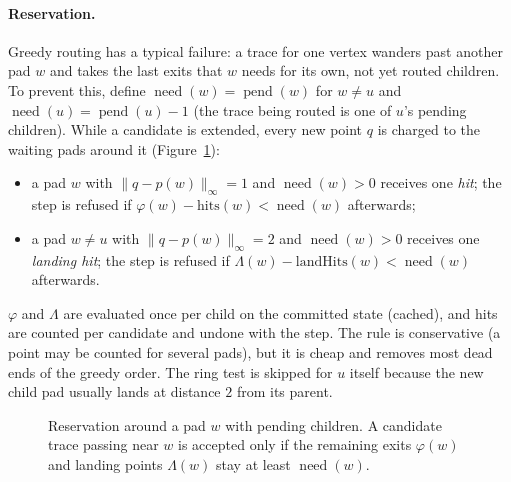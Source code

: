 \documentclass[11pt,a4paper]{article}
\newcommand{\gridbg}[4]{\draw[gridc,line width=0.4pt,step={(1,-1)}] (#1,#2) grid (#3,#4);}
\theoremstyle{remark}
\newcommand{\pos}{p}
\newcommand{\cheb}[1]{\lVert #1 \rVert_\infty}
\newcommand{\pend}{\operatorname{pend}}
\newcommand{\need}{\operatorname{need}}
\newcommand{\freed}{\varphi}
\newcommand{\landpts}{\Lambda}
\begin{document}
\paragraph{Reservation.} Greedy routing has a typical failure: a trace for one vertex wanders past another pad $w$
and takes the last exits that $w$ needs for its own, not yet routed children. To prevent this, define
$\need(w)=\pend(w)$ for $w\ne u$ and $\need(u)=\pend(u)-1$ (the trace being routed is one of $u$'s pending
children). While a candidate is extended, every new point $q$ is charged to the waiting pads around it
(Figure~\ref{fig:reserve}):
\begin{itemize}[nosep]
  \item a pad $w$ with $\cheb{q-\pos(w)}=1$ and $\need(w)>0$ receives one \emph{hit}; the step is refused if
        $\freed(w)-\mathrm{hits}(w)<\need(w)$ afterwards;
  \item a pad $w\neq u$ with $\cheb{q-\pos(w)}=2$ and $\need(w)>0$ receives one \emph{landing hit}; the step is refused
        if $\landpts(w)-\mathrm{landHits}(w)<\need(w)$ afterwards.
\end{itemize}
$\freed$ and $\landpts$ are evaluated once per child on the committed state (cached), and hits are counted per
candidate and undone with the step. The rule is conservative (a point may be counted for several pads), but it is
cheap and removes most dead ends of the greedy order. The ring test is skipped for $u$ itself because the new child
pad usually lands at distance $2$ from its parent.

\begin{figure}[t]
\centering
{}
\caption{Reservation around a pad $w$ with pending children. A candidate trace passing near $w$ is accepted only
if the remaining exits $\freed(w)$ and landing points $\landpts(w)$ stay at least $\need(w)$.}
\label{fig:reserve}
\end{figure}
\end{document}
